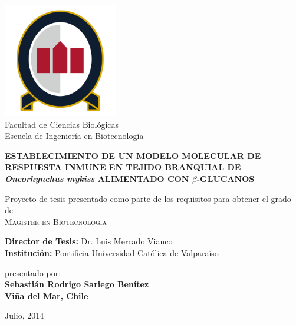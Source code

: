 \documentclass[12pt,a4paper,oneside]{scrbook}
\begin{document}
\begin{titlepage}
    \begin{center}
    
        
\includegraphics[width=5cm]{unab}\\
\vspace{0.1cm}
Facultad de Ciencias Biológicas\\
Escuela de Ingeniería en Biotecnología

        \vspace*{1cm}
        
       \large{ \textbf{ \uppercase{Establecimiento de un modelo molecular de respuesta inmune en tejido branquial de} \emph{Oncorhynchus mykiss} \uppercase{alimentado con $\beta$-glucanos}}}
        
        \vspace{0.5cm}
        
        \vspace{1.5cm}
 
        Proyecto de tesis presentado como parte de los requisitos para obtener el grado de \\
        \large{\textsc{Magister en Biotecnología}}\\ 
        
        \vspace{3cm}        
         
        \textbf{Director de Tesis:} Dr. Luis Mercado Vianco\\
        \textbf{Institución:} Pontificia Universidad Católica de Valparaíso       
       
             
        
         \vspace{1.5cm}
         presentado por:\\
         \vspace{0.1cm}
         \textbf{Sebastián Rodrigo Sariego Benítez}\\
         \textbf{Viña del Mar, Chile}
         
       

        
        
 
        Julio, 2014
        
 
 
     \end{center}
    \thispagestyle{empty}
\end{titlepage}
\end{document}
